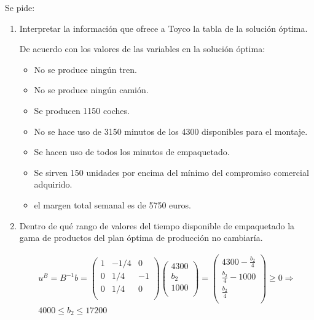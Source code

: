 Se pide:

\begin{enumerate}
    \item Interpretar la información que ofrece a Toyco la tabla de la solución óptima.

    De acuerdo con los valores de las variables en la solución óptima:
    \begin{itemize}
        \item No se produce ningún tren.
        \item No se produce ningún camión.
        \item Se producen 1150 coches.
        \item No se hace uso de 3150 minutos de los 4300 disponibles para el montaje.
        \item Se hacen uso de todos los minutos de empaquetado.
        \item Se sirven 150 unidades por encima del mínimo del compromiso comercial adquirido.
        \item el margen total semanal es de 5750 euros.
    \end{itemize}
    

    \item Dentro de qué rango de valores del tiempo disponible de empaquetado la gama de productos del plan óptima de producción no cambiaría.

    \begin{equation}
    \begin{split}
    u^B=B^{-1}b =
    \begin{pmatrix}
    1 & -1/4 & 0\\
    0 & 1/4 & -1\\
    0 & 1/4 & 0\\
    \end{pmatrix}
    \begin{pmatrix}
    4300\\
    b_2\\
    1000\\
    \end{pmatrix}
     = \begin{pmatrix}
    4300 - \frac{b_2}{4}\\
    \frac{b_2}{4} - 1000\\
    \frac{b_2}{4}\\
    \end{pmatrix}
    \geq 0 \Rightarrow \\
    4000 \leq b_2 \leq 17200
    \end{split}
    \end{equation}


\end{enumerate}
